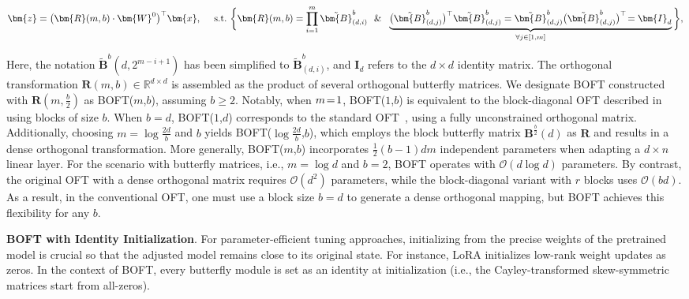 \begin{equation}
    \begin{aligned}\nonumber
    \bm{z}=\big(\bm{R}(m,b)\cdot\bm{W}^0\big)^\top\bm{x},~~~~\text{s.t.}~\bigg{\{}\bm{R}(m,b)=\prod_{i=1}^m \tilde{\bm{B}}^b_{(d,i)}~~\&~~\underbrace{\big(\tilde{\bm{B}}^b_{(d,j)}\big)^\top\tilde{\bm{B}}^b_{(d,j)}=\tilde{\bm{B}}^b_{(d,j)}\big(\tilde{\bm{B}}^b_{(d,j)}\big)^\top\!=\bm{I}_d}_{\forall j\in [1, m]}\bigg{\}},
    \end{aligned}
\end{equation}

Here, the notation $\tilde{\bm{B}}^b(d,2^{m-i+1})$ has been simplified to $\tilde{\bm{B}}^b_{(d,i)}$, and $\bm{I}_d$ refers to the $d \times d$ identity matrix. The orthogonal transformation $\bm{R}(m,b)\in\mathbb{R}^{d\times d}$ is assembled as the product of several orthogonal butterfly matrices. We designate BOFT constructed with $\bm{R}(m, \frac{b}{2})$ as BOFT($m$,$b$), assuming $b\geq 2$. Notably, when $\thickmuskip=2mu \medmuskip=2mu m=1$, BOFT($1$,$b$) is equivalent to the block-diagonal OFT described in~\cite{qiu2023controlling} using blocks of size $b$. When $b=d$, BOFT($1$,$d$) corresponds to the standard OFT~\cite{qiu2023controlling}, using a fully unconstrained orthogonal matrix. Additionally, choosing $m=\log \frac{2d}{b}$ and $b$ yields BOFT($\log \frac{2d}{b}$,$b$), which employs the block butterfly matrix $\bm{B}^{\frac{b}{2}}(d)$ as $\bm{R}$ and results in a dense orthogonal transformation. More generally, BOFT($m$,$b$) incorporates $\frac{1}{2}(b-1)dm$ independent parameters when adapting a $d\times n$ linear layer. For the scenario with butterfly matrices, i.e., $m=\log d$ and $b=2$, BOFT operates with $\mathcal{O}(d\log d)$ parameters. By contrast, the original OFT with a dense orthogonal matrix requires $\mathcal{O}(d^2)$ parameters, while the block-diagonal variant with $r$ blocks uses $\mathcal{O}(bd)$. As a result, in the conventional OFT, one must use a block size $b=d$ to generate a dense orthogonal mapping, but BOFT achieves this flexibility for any $b$.

\textbf{BOFT with Identity Initialization}. For parameter-efficient tuning approaches, initializing from the precise weights of the pretrained model is crucial so that the adjusted model remains close to its original state. For instance, LoRA initializes low-rank weight updates as zeros. In the context of BOFT, every butterfly module is set as an identity at initialization (i.e., the Cayley-transformed skew-symmetric matrices start from all-zeros).

